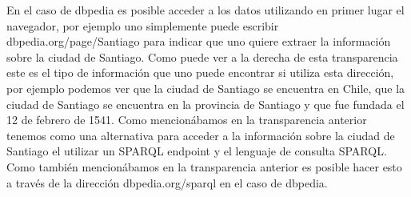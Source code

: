 En el caso de dbpedia es posible acceder a los datos utilizando en primer lugar el navegador, por ejemplo uno simplemente puede escribir dbpedia.org/page/Santiago para indicar que uno quiere extraer la información sobre la ciudad de Santiago. Como puede ver a la derecha de esta transparencia este es el tipo de información que uno puede encontrar si utiliza esta dirección, por ejemplo podemos ver que la ciudad de Santiago se encuentra en Chile, que la ciudad de Santiago se encuentra en la provincia de Santiago y que fue fundada el 12 de febrero de 1541. Como mencionábamos en la transparencia anterior tenemos como una alternativa para acceder a la información sobre la ciudad de Santiago el utilizar un SPARQL endpoint y el lenguaje de consulta SPARQL. Como también mencionábamos en la transparencia anterior es posible hacer esto a través de la dirección dbpedia.org/sparql en el caso de dbpedia.

